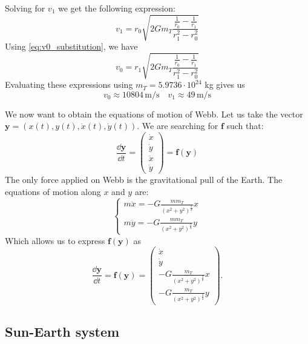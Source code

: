 Solving for \(v_1\) we get the following expression:
\begin{equation}
    v_1 = r_0 \sqrt{2 G m_T \frac{\frac{1}{r_0}-\frac{1}{r_1}}{r_1^2-r_0^2}}
\end{equation}
Using \autoref{eq:v0_substitution}, we have
\begin{equation}
    v_0 = r_1 \sqrt{2 G m_T \frac{\frac{1}{r_0}-\frac{1}{r_1}}{r_1^2-r_0^2}}
\end{equation}
Evaluating these expressions using \(m_T = 5.9736 \cdot 10^{24}\) kg gives us
\begin{equation}
    v_0 \approx 10804 \, \textrm{m/s} \quad v_1 \approx 49 \, \textrm{m/s}
\end{equation}

We now want to obtain the equations of motion of Webb. Let us take the vector \(\mathbf{y} = (x(t), y(t), \dot x(t), \dot y(t))\). We are searching for \(\mathbf{f}\) such that:
\begin{equation}
    \frac{\dd \mathbf{y}}{\dd t} = \left(\begin{matrix} \dot x \\ \dot y \\ \ddot x \\ \ddot y \end{matrix}\right) = \mathbf{f}(\mathbf{y})
\end{equation}
The only force applied on Webb is the gravitational pull of the Earth. The equations of motion along \(x\) and \(y\) are:
\begin{equation}
    \begin{cases}
        m \ddot x = -G \frac{m m_T}{\left(x^2+y^2\right)^\frac{3}{2}} x \\
        m \ddot y = -G \frac{m m_T}{\left(x^2+y^2\right)^\frac{3}{2}} y
    \end{cases}
\end{equation}
Which allows us to express \(\mathbf{f}(\mathbf{y})\) as
\begin{equation}
    \frac{\dd \mathbf{y}}{\dd t} = \mathbf{f}(\mathbf{y}) = \left(\begin{matrix} \dot x \\ \dot y \\ -G \frac{m_T}{\left(x^2+y^2\right)^\frac{3}{2}} x \\ -G \frac{m_T}{\left(x^2+y^2\right)^\frac{3}{2}} y \end{matrix}\right).
\end{equation}

\subsection{Sun-Earth system}

